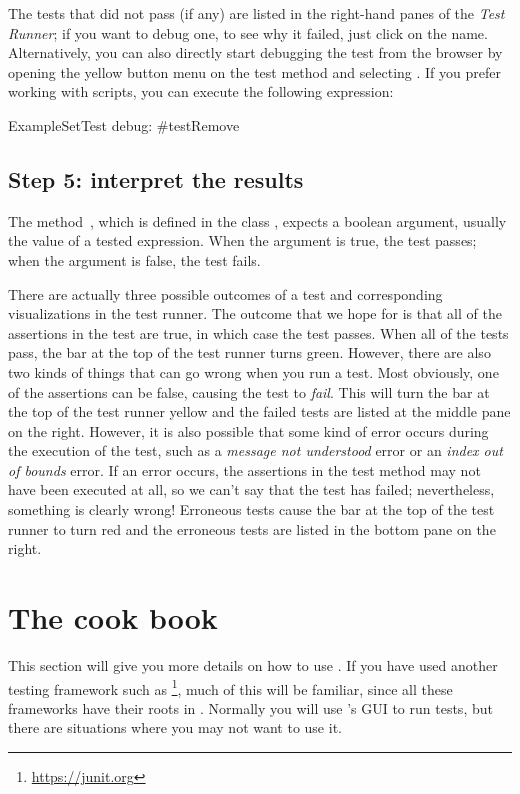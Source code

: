 \documentclass[a4paper,10pt,twoside]{book}
\begin{document}
The tests that did not pass (if any) are listed in the right-hand panes of the \emph{Test Runner}; if you want to debug one, to see why it failed, just click on the name.
Alternatively, you can also directly start debugging the test from the browser by opening the yellow button menu on the test method and selecting .
If you prefer working with scripts, you can execute the following expression:
\begin{code}{}
ExampleSetTest debug: #testRemove
\end{code}

\subsection{Step 5: interpret the results}

The method \,, which is defined in the class , expects a boolean argument, usually the value of a tested expression.
When the argument is true, the test passes; when the argument is false, the test fails.

There are actually three possible outcomes of a test and corresponding visualizations in the test runner.
The outcome that we hope for is that all of the assertions in the test are true, in which case the test passes.
When all of the tests pass, the bar at the top of the test runner turns green.
However, there are also two kinds of things that can go wrong when you run a test.
Most obviously, one of the assertions can be false, causing the test to \emph{fail}.
This will turn the bar at the top of the test runner yellow and the failed tests are listed at the middle pane on the right.
However, it is also possible that some kind of error occurs during the execution of the test, such as a \emph{message not understood} error or an \emph{index out of bounds} error.
If an error occurs, the assertions in the test method may not have been executed at all, so we can't say that the test has failed; nevertheless, something is clearly wrong!
Erroneous tests cause the bar at the top of the test runner to turn red and the erroneous tests are listed in the bottom pane on the right.


\section{The \SUnit cook book}
This section will give you more details on how to use \SUnit.
If you have used another testing framework such as \JUnit\footnote{\url{https://junit.org}}, much of this will be familiar, since all these frameworks have their roots in \SUnit.
Normally you will use \SUnit's GUI to run tests, but there are situations where you may not want to use it.
\end{document}
